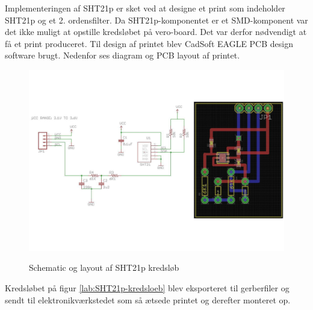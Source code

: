 Implementeringen af SHT21p er sket ved at designe et print som indeholder SHT21p og et 2. ordensfilter. 
Da SHT21p-komponentet er et SMD-komponent var det ikke muligt at opstille kredsløbet på vero-board. Det var derfor nødvendigt at få et print produceret. Til design af printet blev CadSoft EAGLE PCB design software brugt. Nedenfor ses diagram og PCB layout af printet.


\begin{figure}[htb]
\centering
{\includegraphics[width=\textwidth]{filer/implementering/SHT_pcb}}
\caption{Schematic og layout af SHT21p kredsl\o{}b}
\label{lab:SHT21-kredsloeb}
\end{figure}

Kredsløbet på figur \ref{lab:SHT21p-kredsloeb} blev eksporteret til gerberfiler og sendt til elektronikværkstedet som så ætsede printet og derefter monteret op.

